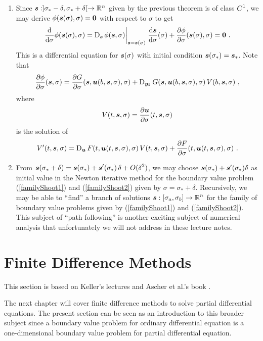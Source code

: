 \begin{rmkList}
\begin{enumerate}
\item Since $\bm{s}:]\sigma_\ast -\delta,\sigma_\ast + \delta[ \to \mathbb{R}^n$
given by the previous theorem is of class $\displaystyle C^1$, we may derive
$\phi(\bm{s}(\sigma), \sigma) = \bm{0}$ with respect to $\sigma$
to get
\[
\frac{\mathrm{d}}{\mathrm{d}{\sigma}}{\phi(\bm{s}(\sigma), \sigma)}
= \operatorname{D}_{\bm{s}}\phi(\bm{s},\sigma)\bigg|_{\bm{s} = \bm{s}(\sigma)}\;
\frac{\mathrm{d}\bm{s}}{\mathrm{d}{\sigma}}(\sigma)
+ \frac{\partial{\phi}}{\partial{\sigma}}(\bm{s}(\sigma),\sigma) = \bm{0} \ .
\]
This is a differential equation for $\bm{s}(\sigma)$ with initial
condition $\bm{s}(\sigma_\ast) = \bm{s}_\ast$.
Note that
\[
\frac{\partial{\phi}}{\partial{\sigma}}(\bm{s},\sigma)
= \frac{\partial{G}}{\partial{\sigma}}(\bm{s},\bm{u}(b,\bm{s},\sigma),\sigma) +
\operatorname{D}_{\bm{y}_2}G(\bm{s},\bm{u}(b,\bm{s},\sigma),\sigma)
\,V(b,\bm{s},\sigma) \ ,
\]
where
\[
V(t,\bm{s},\sigma) = 
\frac{\partial{\bm{u}}}{\partial{\sigma}}(t,\bm{s},\sigma)
\]
is the solution of
\[
V'(t,\VEC{s},\sigma) =
\diff_{\VEC{u}} F(t,\VEC{u}(t,\VEC{s},\sigma),\sigma)
\,V(t,\VEC{s},\sigma) +
\pdydx{F}{\sigma}(t,\VEC{u}(t,\VEC{s},\sigma),\sigma) \ .
\]
\item From $\displaystyle \bm{s}(\sigma_\ast+\delta) = \bm{s}(\sigma_\ast) +
\bm{s}'(\sigma_\ast)\, \delta + O(\delta^2)$, we may choose
$\bm{s}(\sigma_\ast) + \bm{s}'(\sigma_\ast)\delta$ as initial value
in the Newton iterative method for the boundary value problem
(\ref{familyShoot1}) and (\ref{familyShoot2}) given by
$\sigma = \sigma_\ast + \delta$.  Recursively, we may be able to
``find'' a branch of solutions
$\displaystyle \bm{s}:[\sigma_a,\sigma_b]\to \mathbb{R}^n$
for the family of boundary value problems given by
(\ref{familyShoot1}) and (\ref{familyShoot2}).  This subject of
``path following'' is another exciting subject of numerical analysis
that unfortunately we will not address in these lecture notes.
\end{enumerate}
\end{rmkList}

\section{Finite Difference Methods}

This section is based on Keller's lectures \cite{K} and Ascher et
al.'s book \cite{AMR}.

The next chapter will cover finite difference methods to solve partial
differential equations.  The present section can be seen as an
introduction to this broader subject since a boundary value problem
for ordinary differential equation is a one-dimensional boundary value
problem for partial differential equation.


